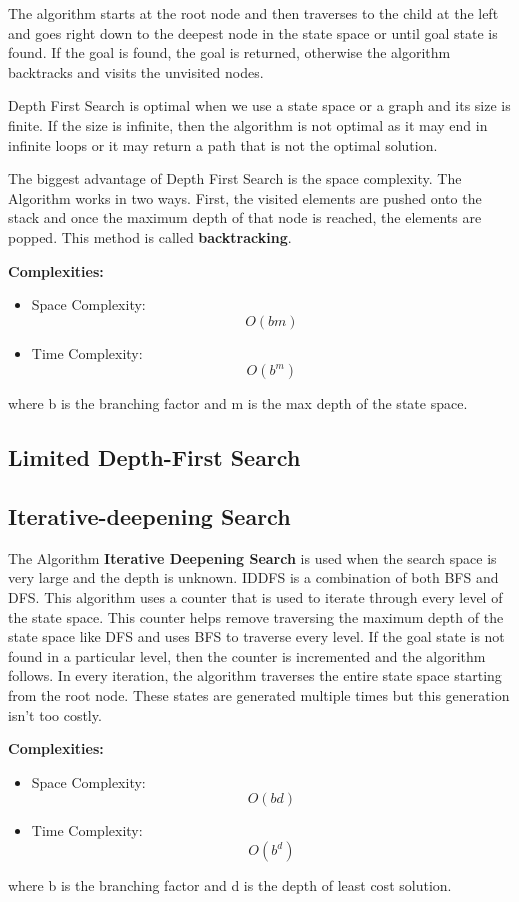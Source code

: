 \documentclass[11pt]{article}
\begin{document}
The algorithm starts at the root node and then traverses to the child at the left and goes right down to the deepest node in the state space or until goal state is found. If the goal is found, the goal is returned, otherwise the algorithm backtracks and visits the unvisited nodes. 

Depth First Search is optimal when we use a state space or a graph and its size is finite. If the size is infinite, then the algorithm is not optimal as it may end in infinite loops or it may return a path that is not the optimal solution.

The biggest advantage of Depth First Search is the space complexity.
The Algorithm works in two ways. First, the visited elements are pushed onto the stack and once the maximum depth of that node is reached, the elements are popped. This method is called \textbf{backtracking}.

\textbf{Complexities:}
\begin{itemize}
\item Space Complexity: \[O(bm)\]
\item Time Complexity: \[ O(b^m)\]
\end{itemize}

where b is the branching factor and m is the max depth of the state space.

\subsection{Limited Depth-First Search}

\subsection{Iterative-deepening Search}
The Algorithm \textbf{Iterative Deepening Search} is used when the search space is very large and the depth is unknown. IDDFS is a combination of both BFS and DFS. This algorithm uses a counter that is used to iterate through every level of the state space. This counter helps remove traversing the maximum depth of the state space like DFS and uses BFS to traverse every level. If the goal state is not found in a particular level, then the counter is incremented and the algorithm follows. In every iteration, the algorithm traverses the entire state space starting from the root node. These states are generated multiple times but this generation isn't too costly. 

\textbf{Complexities:}
\begin{itemize}
\item Space Complexity: \[O(bd)\]
\item Time Complexity: \[ O(b^d)\]
\end{itemize}
where b is the branching factor and d is the depth of least cost solution.
\end{document}
